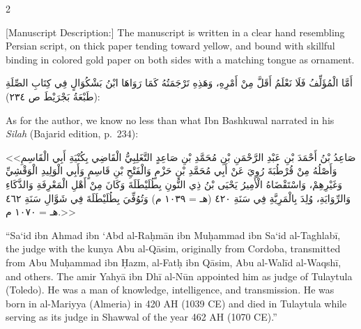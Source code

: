 \documentclass[11pt,a4paper]{article}
\begin{document}
\begin{paracol}{2}
\begin{rightcolumn}
\vspace{0.2cm}
[Manuscript Description:] The manuscript is written in a clear hand resembling Persian script, on thick paper tending toward yellow, and bound with skillful binding in colored gold paper on both sides with a matching tongue as ornament.
\end{rightcolumn}

\switchcolumn

\begin{leftcolumn}
\vspace{0.2cm}
{\arabicfont\beginR
أَمَّا الْمُؤَلِّفُ فَلَا نَعْلَمُ أَقَلَّ مِنْ أَمْرِهِ، وَهَذِهِ تَرْجَمَتُهُ كَمَا رَوَاهَا ابْنُ بَشْكُوَالٍ فِي كِتَابِ الصِّلَةِ (طَبْعَةُ بَجْرَيْطَ ص ٢٣٤):
\endR}
\end{leftcolumn}

\begin{rightcolumn}
\vspace{0.2cm}
As for the author, we know no less than what Ibn Bashkuwal narrated in his \textit{Silah} (Bajarid edition, p.~234):
\end{rightcolumn}

\switchcolumn

\begin{leftcolumn}
\vspace{0.2cm}
{\arabicfont\beginR
<<صَاعِدُ بْنُ أَحْمَدَ بْنِ عَبْدِ الرَّحْمَنِ بْنِ مُحَمَّدِ بْنِ صَاعِدٍ التَّغَلِبِيُّ الْقَاضِي بِكُنْيَةِ أَبِي الْقَاسِمِ وَأَصْلُهُ مِنْ قُرْطُبَةَ رُوِيَ عَنْ أَبِي مُحَمَّدِ بْنِ حَزْمٍ وَالْفَتْحِ بْنِ قَاسِمٍ وَأَبِي الْوَلِيدِ الْوَقْشِيِّ وَغَيْرِهِمْ، وَاسْتَقْضَاهُ الْأَمِيرُ يَحْيَى بْنُ ذِي النُّونِ بِطُلَيْطَلَةَ وَكَانَ مِنْ أَهْلِ الْمَعْرِفَةِ وَالذَّكَاءِ وَالرِّوَايَةِ، وُلِدَ بِالْمَرِيَّةِ فِي سَنَةِ ٤٢٠ (هـ = ١٠٣٩ م) وَتُوُفِّيَ بِطُلَيْطَلَةَ فِي شَوَّالِ سَنَةِ ٤٦٢ هـ = ١٠٧٠ م.>>
\endR}
\end{leftcolumn}

\begin{rightcolumn}
\vspace{0.2cm}
``Sa\textquoteleft id ibn Ahmad ibn \textquoteleft Abd al-Ra\d{h}m\={a}n ibn Mu\d{h}ammad ibn Sa\textquoteleft id al-Taghlab\={i}, the judge with the kunya Abu al-Q\={a}sim, originally from Cordoba, transmitted from Abu Mu\d{h}ammad ibn \d{H}azm, al-Fat\d{h} ibn Q\={a}sim, Abu al-Wal\={i}d al-Waqsh\={i}, and others. The amir Yahy\={a} ibn Dh\={i} al-N\={u}n appointed him as judge of Tulaytula (Toledo). He was a man of knowledge, intelligence, and transmission. He was born in al-Mariyya (Almeria) in 420 AH (1039 CE) and died in Tulaytula while serving as its judge in Shawwal of the year 462 AH (1070 CE).''
\end{rightcolumn}

\end{paracol}
\end{document}
